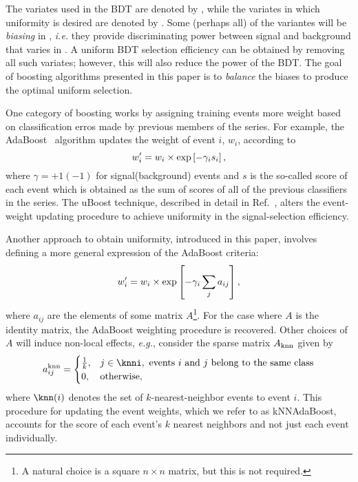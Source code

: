 The variates used in the BDT are denoted by \x, while the variates in which uniformity is desired are denoted by \y.  Some (perhaps all) of the \x variantes will be {\em biasing} in \y, {\em i.e.} they provide discriminating power between signal and background that varies in \y.  A uniform BDT selection efficiency can be obtained by removing all such variates; however, this will also reduce the power of the BDT.  The goal of boosting algorithms presented in this paper is to {\em balance} the biases to produce the optimal uniform selection.

One category of boosting works by assigning training events more weight based on classification erros made by previous members of the series.  For example, the AdaBoost~\cite{ref:adaboost} algorithm updates the weight of event $i$, $w_i$, according to
\begin{equation}
w_i^{\prime} = w_i \times {\rm exp}\left[-\gamma_i s_i\right], 
\end{equation}
where $\gamma = +1(-1)$ for signal(background) events and $s$ is the so-called score of each event which is obtained as the sum of scores of all of the previous classifiers in the series.  
The uBoost technique, described in detail in Ref.~\cite{cit:uboost}, alters the event-weight updating procedure to achieve uniformity in the signal-selection efficiency. 


Another approach to obtain uniformity, introduced in this paper, involves defining a more general expression of the AdaBoost criteria:
\begin{equation}
 w_i^{\prime} = w_i \times {\rm exp}\left[-\gamma_i \sum_j a_{ij}\right],
\end{equation}
where $a_{ij}$ are the elements of some matrix $A$\footnote{A natural choice is a square $n\times n$ matrix, but this is not required.}.  For the case where $A$ is the identity matrix, the AdaBoost weighting procedure is recovered.  
Other choices of $A$ will induce non-local effects, {\em e.g.}, consider the sparse matrix $A_{\rm knn}$ given by
\begin{equation}
  a_{ij}^{\rm knn} = \begin{cases} 
    \frac{1}{k}, & j \in \knni, \text{ events $i$ and $j$ belong to the same class} \\
    0, & \text{otherwise},
\end{cases}
\end{equation}
where $\knn(i)$ denotes the set of $k$-nearest-neighbor events to event $i$.
This procedure for updating the event weights, which we refer to as kNNAdaBoost, accounts for the score of each event's $k$ nearest neighbors and not just each event individually.


